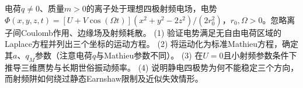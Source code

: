 电荷\(q\ne0\)、质量\(m>0\)的离子处于理想四极射频电场，电势\(\Phi(x,y,z,t)=[U+V\cos(\Omega t)](x^2+y^2-2z^2)/(2r_0^2)\)，\(r_0,\Omega>0\)。忽略离子间Coulomb作用、边缘场及射频耗散。
(1) 验证电势满足无自由电荷区域的Laplace方程并列出三个坐标的运动方程。
(2) 将运动化为标准Mathieu方程，确定其\(a\)、\(q_M\)参数（注意电荷\(q\)与Mathieu参数不同）。
(3) 在\(U=0\)且小射频参数条件下推导三维赝势与长期世俗振动频率。
(4) 说明静电四极势为何不能稳定三个方向，而射频阱如何绕过静态Earnshaw限制及近似失效情形。
